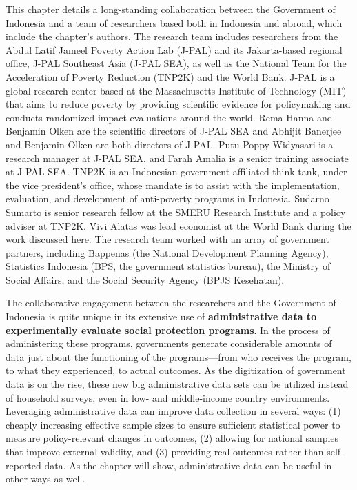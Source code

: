 This chapter details a long-standing collaboration between the Government of Indonesia and a team of researchers based both in Indonesia and abroad, which include the chapter's authors. The research team includes researchers from the Abdul Latif Jameel Poverty Action Lab (J-PAL) and its Jakarta-based regional office, J-PAL Southeast Asia (J-PAL SEA), as well as the National Team for the Acceleration of Poverty Reduction (TNP2K) and the World Bank. J-PAL is a global research center based at the Massachusetts Institute of Technology (MIT) that aims to reduce poverty by providing scientific evidence for policymaking and conducts randomized impact evaluations around the world. Rema Hanna and Benjamin Olken are the scientific directors of J-PAL SEA and Abhijit Banerjee and Benjamin Olken are both directors of J-PAL. Putu Poppy Widyasari is a research manager at J-PAL SEA, and Farah Amalia is a senior training associate at J-PAL SEA. TNP2K is an Indonesian government-affiliated think tank, under the vice president's office, whose mandate is to assist with the implementation, evaluation, and development of anti-poverty programs in Indonesia. Sudarno Sumarto is senior research fellow at the SMERU Research Institute and a policy adviser at TNP2K. Vivi Alatas was lead economist at the World Bank during the work discussed here. The research team worked with an array of government partners, including Bappenas (the National Development Planning Agency), Statistics Indonesia (BPS, the government statistics bureau), the Ministry of Social Affairs, and the Social Security Agency (BPJS Kesehatan).

The collaborative engagement between the researchers and the Government of Indonesia is quite unique in its extensive use of \textbf{administrative data to experimentally evaluate social protection programs}. In the process of administering these programs, governments generate considerable amounts of data just about the functioning of the programs---from who receives the program, to what they experienced, to actual outcomes. As the digitization of government data is on the rise, these new big administrative data sets can be utilized instead of household surveys, even in low- and middle-income country environments. Leveraging administrative data can improve data collection in several ways: (1) cheaply increasing effective sample sizes to ensure sufficient statistical power to measure policy-relevant changes in outcomes, (2) allowing for national samples that improve external validity, and (3) providing real outcomes rather than self-reported data. As the chapter will show, administrative data can be useful in other ways as well.

